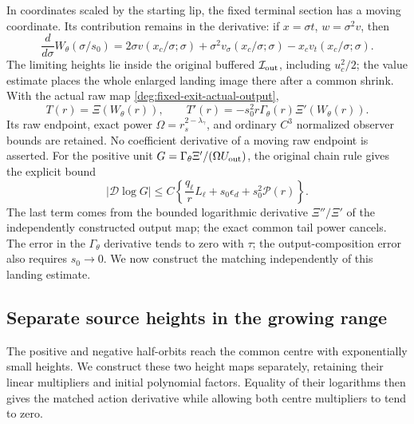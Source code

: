 In coordinates scaled by the starting lip, the fixed terminal section
has a moving coordinate. Its contribution remains in the derivative: if \(x=\sigma t\), \(w=\sigma^2v\), then
\[
 \frac{d}{d\sigma}W_\theta(\sigma/s_0)
 =2\sigma v(x_c/\sigma;\sigma)
  +\sigma^2v_\sigma(x_c/\sigma;\sigma)
  -x_cv_t(x_c/\sigma;\sigma).
\]
The limiting heights lie inside the original buffered
\(\mathcal I_{\rm out}\), including \(u_c^2/2\); the value estimate
places the whole enlarged landing image there after a common shrink.
With the actual raw map \eqref{deg:fixed-exit-actual-output},
\[
 T(r)=\Xi(W_\theta(r)),\qquad
 T'(r)=-s_0^2r\Gamma_\theta(r)\Xi'(W_\theta(r)).
\]
Its raw endpoint, exact power \(\Omega=r_s^{2-\lambda_\gamma}\),
and ordinary \(C^3\) normalized observer bounds are retained.
No coefficient derivative of a moving raw endpoint is asserted.
For the positive unit \(G=\Gamma_\theta\Xi'/(\Omega U_{\rm out})\),
the original chain rule gives the explicit bound
\begin{equation}\label{deg:landing-direct-raw-first-row}
 |\mathcal D\log G|
 \le C\left\{\frac{q_\ell}{r}L_\ell+s_0\epsilon_d
                           +s_0^2\mathcal P(r)\right\}.
\end{equation}
The last term comes from the bounded logarithmic derivative
\(\Xi''/\Xi'\) of the independently constructed output map;
the exact common tail power cancels.
The error in the \(\Gamma_\theta\) derivative tends to zero with
$\tau$; the output-composition error also requires $s_0\to0$.
We now construct the matching independently of this landing estimate.

\subsection{Separate source heights in the growing range}

The positive and negative half-orbits reach the common centre with
exponentially small heights. We construct these two height maps
separately, retaining their linear multipliers and initial polynomial
factors. Equality of their logarithms then gives the matched action
derivative while allowing both centre multipliers to tend to zero.

